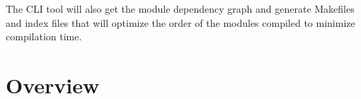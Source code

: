 The CLI tool will also get the module dependency graph and generate Makefiles
and index files that will optimize the order of the modules compiled to
minimize compilation time.

\section{Overview}






%
